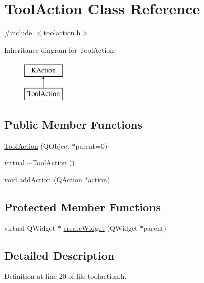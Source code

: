 \hypertarget{classToolAction}{\section{Tool\+Action Class Reference}
\label{classToolAction}
}


{\ttfamily \#include $<$toolaction.\+h$>$}

Inheritance diagram for Tool\+Action\+:\begin{figure}[H]
\begin{center}
\leavevmode
\includegraphics[height=2.000000cm]{classToolAction}
\end{center}
\end{figure}
\subsection*{Public Member Functions}
\begin{DoxyCompactItemize}
\item 
\hyperlink{classToolAction_a802eab902001a9ab965e98628ace443f}{Tool\+Action} (Q\+Object $\ast$parent=0)
\item 
virtual \hyperlink{classToolAction_a9d97ba7f4ce160ec5ce290a2794811f4}{$\sim$\+Tool\+Action} ()
\item 
void \hyperlink{classToolAction_a30cc899c6a7167fd9e7023f6e0a5ebf1}{add\+Action} (Q\+Action $\ast$action)
\end{DoxyCompactItemize}
\subsection*{Protected Member Functions}
\begin{DoxyCompactItemize}
\item 
virtual Q\+Widget $\ast$ \hyperlink{classToolAction_a29e9fda5b5fb4833bd22f767622b1a0a}{create\+Widget} (Q\+Widget $\ast$parent)
\end{DoxyCompactItemize}


\subsection{Detailed Description}


Definition at line 20 of file toolaction.\+h.




